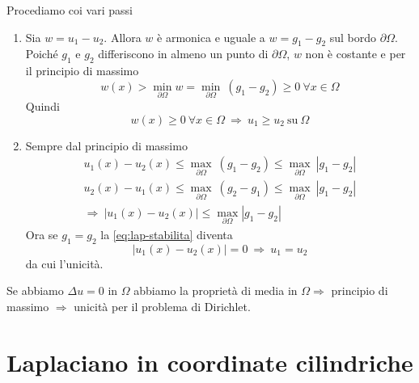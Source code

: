 \begin{dimostrazione}
    Procediamo coi vari passi
    \begin{enumerate}
        \item Sia $w=u_{1} -u_{2}$. Allora $w$ è armonica e uguale a $w=g_{1}-g_{2}$ sul bordo $\partial \Omega$. Poiché $g_{1}$ e $g_{2}$ differiscono in almeno un punto di $\partial \Omega $, $w$ non è costante e per il principio di massimo
              \begin{equation*}
                  w(x)  >\min_{\partial \Omega } w =\min_{\partial \Omega } \ (g_{1} -g_{2}) \geq 0\ \forall x\in \Omega
              \end{equation*}
              Quindi
              \begin{equation*}
                  w(x) \geq 0\ \forall x\in \Omega \ \Rightarrow \ u_{1} \geq u_{2} \ \mathrm{su} \ \Omega
              \end{equation*}
        \item Sempre dal principio di massimo
              \begin{gather*}
                  u_{1}(x) -u_{2}(x) \leq \max_{\partial \Omega } \ (g_{1} -g_{2}) \leq \max_{\partial \Omega } \ | g_{1} -g_{2}| \\
                  u_{2}(x) -u_{1}(x) \leq \max_{\partial \Omega } \ (g_{2} -g_{1}) \leq \max_{\partial \Omega } \ | g_{1} -g_{2}| \\
                  \Rightarrow \ | u_{1}(x) -u_{2}(x)| \leq \max_{\partial \Omega }| g_{1} -g_{2}|
              \end{gather*}
              Ora se $\displaystyle g_{1} =g_{2}$ la \eqref{eq:lap-stabilita} diventa
              \begin{equation*}
                  | u_{1}(x) -u_{2}(x)| =0\ \Rightarrow \ u_{1} =u_{2}
              \end{equation*}
              da cui l'unicità.
    \end{enumerate}
\end{dimostrazione}

Se abbiamo $\Delta u=0$ in $\Omega $ abbiamo la proprietà di media in $\Omega \Rightarrow $ principio di massimo $\Rightarrow $ unicità per il problema di Dirichlet.
\section{Laplaciano in coordinate cilindriche}

